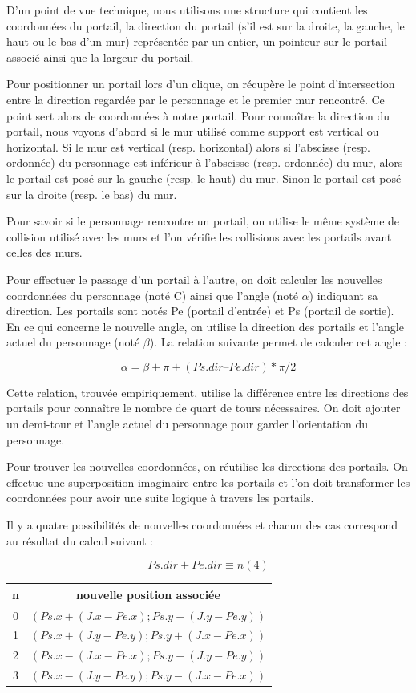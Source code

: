 \documentclass[11pt]{article}
\begin{document}
D’un point de vue technique, nous utilisons une structure qui contient les coordonnées du portail, la direction du portail (s’il est sur la droite, la gauche, le haut ou le bas d’un mur) représentée par un entier, un pointeur sur le portail associé ainsi que la largeur du portail.

Pour positionner un portail lors d’un clique, on récupère le point d’inter\-section entre la direction regardée par le personnage et le premier mur rencontré. Ce point sert alors de coordonnées à notre portail. Pour connaître la direction du portail, nous voyons d’abord si le mur utilisé comme support est vertical ou horizontal. 
Si le mur est vertical (resp. horizontal) alors si l’abscisse (resp. ordonnée) du personnage est inférieur à l’abscisse (resp. ordonnée) du mur, alors le portail est posé sur la gauche (resp. le haut) du mur. Sinon  le portail est posé sur la droite (resp. le bas) du mur.

Pour savoir si le personnage rencontre un portail, on utilise le même système de collision utilisé avec les murs et l’on vérifie les collisions avec les portails avant celles des murs.

Pour effectuer le passage d’un portail à l’autre, on doit calculer les nouvelles coordonnées du personnage (noté C) ainsi que l’angle (noté $\alpha$) indiquant sa direction. Les portails sont notés Pe (portail d’entrée) et Ps (portail de sortie).
En ce qui concerne le nouvelle angle, on utilise la direction des portails et l’angle actuel du personnage (noté $\beta$). La relation suivante permet de calculer cet angle :

$$\alpha = \beta + \pi + (Ps.dir – Pe.dir) * \pi / 2$$

Cette relation, trouvée empiriquement, utilise la différence entre les directions des portails pour connaître le nombre de quart de tours nécessaires. On doit ajouter un demi-tour et l’angle actuel du personnage pour garder l’orientation du personnage.

Pour trouver les nouvelles coordonnées, on réutilise les directions des portails. On effectue une superposition imaginaire entre les portails et l’on doit transformer les coordonnées pour avoir une suite logique à travers les portails.

Il y a quatre possibilités de nouvelles coordonnées et chacun des cas correspond au résultat du calcul suivant :

$$Ps.dir + Pe.dir \equiv n (4)$$

\begin{center}
    \begin{tabular}{c|c}
            n & nouvelle position associée \\
            \hline
            0 & $(Ps.x + (J.x - Pe.x) ; Ps.y - (J.y - Pe.y))$ \\ 
            1 & $(Ps.x + (J.y - Pe.y) ; Ps.y + (J.x - Pe.x))$ \\
            2 & $(Ps.x - (J.x - Pe.x) ; Ps.y + (J.y - Pe.y))$ \\
            3 & $(Ps.x - (J.y - Pe.y) ; Ps.y - (J.x - Pe.x))$ \\
    \end{tabular}
\end{center}
\end{document}

